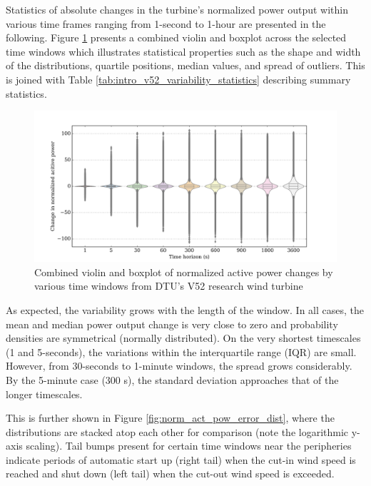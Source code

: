 Statistics of absolute changes in the turbine's normalized power output within various time frames ranging from 1-second to 1-hour are presented in the following. Figure \ref{fig:act_pow_change_vioboxplot} presents a combined violin and boxplot across the selected time windows which illustrates statistical properties such as the shape and width of the distributions, quartile positions, median values, and spread of outliers. This is joined with Table \ref{tab:intro_v52_variability_statistics} describing summary statistics.

\begin{figure}[htbp]
    \centering
        \includegraphics[width=1.0\textwidth]{graphics/intro/variability/act_pow_change_vioboxplot.png}
    \caption{Combined violin and boxplot of normalized active power changes by various time windows from DTU's V52 research wind turbine}
    \label{fig:act_pow_change_vioboxplot}
\end{figure}

\begin{table}
    \centering
    \caption{Table of statistics for V52 power output variability over selected time windows up to 1-hour}
    
    \label{tab:intro_v52_variability_statistics}
\end{table}

As expected, the variability grows with the length of the window. In all cases, the mean and median power output change is very close to zero and probability densities are symmetrical (normally distributed). On the very shortest timescales (1 and 5-seconds), the variations within the interquartile range (IQR) are small. However, from 30-seconds to 1-minute windows, the spread grows considerably. By the 5-minute case (300 s), the standard deviation approaches that of the longer timescales.

This is further shown in Figure \ref{fig:norm_act_pow_error_dist}, where the distributions are stacked atop each other for comparison (note the logarithmic y-axis scaling). Tail bumps present for certain time windows near the peripheries indicate periods of automatic start up (right tail) when the cut-in wind speed is reached and shut down (left tail) when the cut-out wind speed is exceeded.

